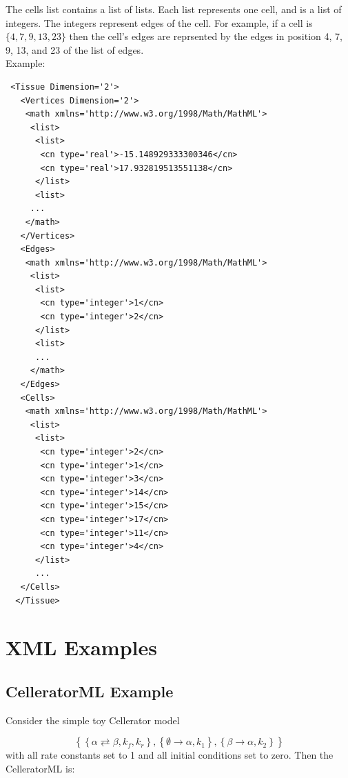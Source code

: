 \documentclass[12pt,letterpaper]{article}
\begin{document}
The cells list contains a list of lists. Each list represents one cell, and is a list of integers. The integers represent edges of the cell. For example, if a cell is $\{4, 7, 9, 13, 23\}$ then the cell's edges are reprsented by the edges in position 4, 7, 9, 13, and 23 of the list of edges. \\


Example:
\begin{verbatim}
 <Tissue Dimension='2'>
   <Vertices Dimension='2'>
    <math xmlns='http://www.w3.org/1998/Math/MathML'>
     <list>
      <list>
       <cn type='real'>-15.148929333300346</cn>
       <cn type='real'>17.932819513551138</cn>
      </list>
      <list>
     ...
    </math>
   </Vertices>
   <Edges>
    <math xmlns='http://www.w3.org/1998/Math/MathML'>
     <list>
      <list>
       <cn type='integer'>1</cn>
       <cn type='integer'>2</cn>
      </list>
      <list>     
      ...
     </math>
   </Edges>
   <Cells>
    <math xmlns='http://www.w3.org/1998/Math/MathML'>
     <list>
      <list>
       <cn type='integer'>2</cn>
       <cn type='integer'>1</cn>
       <cn type='integer'>3</cn>
       <cn type='integer'>14</cn>
       <cn type='integer'>15</cn>
       <cn type='integer'>17</cn>
       <cn type='integer'>11</cn>
       <cn type='integer'>4</cn>
      </list>
      ...
   </Cells>
  </Tissue>
\end{verbatim}


\section{XML Examples}\label{section:xmlexamples}

\subsection{CelleratorML Example}

Consider the simple toy Cellerator model

$$\left\{\left\{\alpha \rightleftarrows \beta
   ,k_f,k_r\right\},\left\{\emptyset \rightarrow \alpha
   ,k_1\right\},\left\{\beta \to \alpha ,k_2\right\}\right\}$$
with all rate constants set to 1 and all initial conditions set to zero. Then the CelleratorML is: 
\end{document}
